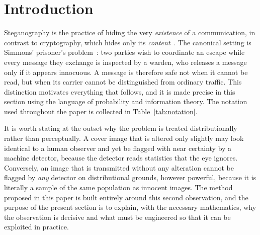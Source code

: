 \documentclass[11pt]{article}
\theoremstyle{definition}
\newcommand{\Tab}[1]{Table~\ref{#1}}
\begin{document}


\section{Introduction}\label{sec:intro}
Steganography is the practice of hiding the very \emph{existence} of a
communication, in contrast to cryptography, which hides only its
\emph{content}~\cite{provos2003}. The canonical setting is Simmons' prisoner's
problem~\cite{simmons}: two parties wish to coordinate an escape while every message they
exchange is inspected by a warden, who releases a message only if it appears
innocuous. A message is therefore safe not when it cannot be read, but when its
carrier cannot be distinguished from ordinary traffic. This distinction motivates
everything that follows, and it is made precise in this section using the language
of probability and information theory. The notation used throughout the paper is
collected in \Tab{tab:notation}.

It is worth stating at the outset why the problem is treated distributionally
rather than perceptually. A cover image that is altered only slightly may look
identical to a human observer and yet be flagged with near certainty by a machine
detector, because the detector reads statistics that the eye ignores. Conversely,
an image that is transmitted without any alteration cannot be flagged by
\emph{any} detector on distributional grounds, however powerful, because it is
literally a sample of the same population as innocent images. The method proposed
in this paper is built entirely around this second observation, and the purpose of
the present section is to explain, with the necessary mathematics, why the
observation is decisive and what must be engineered so that it can be exploited in
practice.
\end{document}
